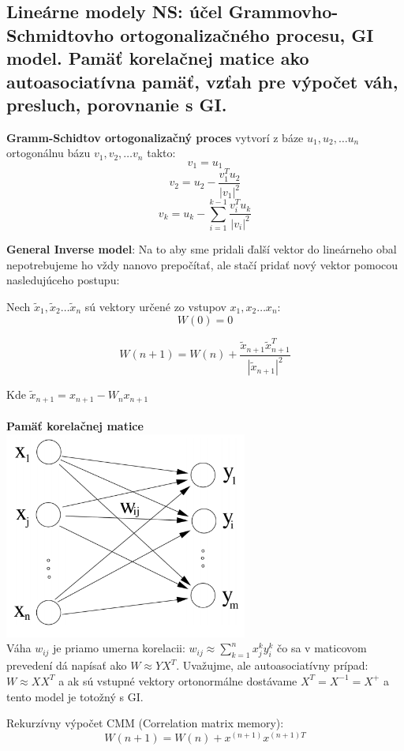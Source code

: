 \documentclass{article}
\numberwithin{equation}{section} %
\begin{document}
\subsection{Lineárne modely NS: účel Grammovho-Schmidtovho ortogonalizačného procesu, GI model. Pamäť korelačnej matice ako autoasociatívna pamäť, vzťah pre výpočet váh, presluch, porovnanie s GI.}

\textbf{Gramm-Schidtov ortogonalizačný proces} vytvorí z báze $u_1, u_2, \dots u_n$ ortogonálnu bázu $v_1, v_2, \dots v_n$ takto:
$$v_1 = u_1$$
$$v_2 = u_2 - \frac{v_1^Tu_2}{|v_1|^2}$$
$$v_k = u_k - \sum_{i=1}^{k-1}{\frac{v_i^Tu_k}{|v_i|^2}}$$

\textbf{General Inverse model}: 
Na to aby sme pridali ďalší vektor do lineárneho obal nepotrebujeme ho vždy nanovo prepočítať, ale stačí pridať nový vektor pomocou nasledujúceho postupu:


Nech $\widetilde{x}_1, \widetilde{x}_2 \dots \widetilde{x}_n$ sú vektory určené zo vstupov $x_1, x_2 \dots x_n$:
$$W(0) = 0$$

$$W(n+1) = W(n) + \frac{\widetilde{x}_{n+1} \widetilde{x}_{n+1}^T}{|\widetilde{x}_{n+1}|^2}$$

Kde $\widetilde{x}_{n+1} = x_{n+1} - W_n x_{n+1}$
\\\\
\textbf{Pamäť korelačnej matice}\\
\includegraphics[width=8cm]{imgs/cmm}\\
Váha $w_{ij}$ je priamo  umerna korelacii: $w_{ij} \approx \sum_{k=1}^n x_{j}^ky_{i}^k$ čo sa v maticovom prevedení dá napísať ako $W \approx YX^T$. Uvažujme, ale autoasociatívny prípad: $W \approx X X^T$ a ak sú vstupné vektory ortonormálne dostávame $X^T = X^{-1} = X^+$ a tento model je totožný s GI.

Rekurzívny výpočet CMM (Correlation matrix memory):
$$W(n+1) = W(n) + x^{(n+1)}  x^{(n+1)T}$$
\end{document}
